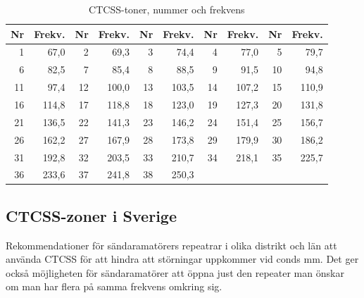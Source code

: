 \begin{table}[H]
\centering
\begin{tabular}{rr|rr|rr|rr|rr}
\textbf{Nr} & \textbf{Frekv.} & \textbf{Nr} & \textbf{Frekv.} & \textbf{Nr} & \textbf{Frekv.} & \textbf{Nr} & \textbf{Frekv.} & \textbf{Nr} & \textbf{Frekv.} \\ \hline
	 1  & 67,0            & 2           & 69,3            & 3           & 74,4            & 4           & 77,0            & 5           & 79,7            \\ \hline
	 6  & 82,5            & 7           & 85,4            & 8           & 88,5            & 9           & 91,5            & 10          & 94,8            \\ \hline
	11  & 97,4            & 12          & 100,0           & 13          & 103,5           & 14          & 107,2           & 15          & 110,9           \\ \hline
	16  & 114,8           & 17          & 118,8           & 18          & 123,0           & 19          & 127,3           & 20          & 131,8           \\ \hline
	21  & 136,5           & 22          & 141,3           & 23          & 146,2           & 24          & 151,4           & 25          & 156,7           \\ \hline
	26  & 162,2           & 27          & 167,9           & 28          & 173,8           & 29          & 179,9           & 30          & 186,2           \\ \hline
	31  & 192,8           & 32          & 203,5           & 33          & 210,7           & 34          & 218,1           & 35          & 225,7           \\ \hline
	36  & 233,6           & 37          & 241,8           & 38          & 250,3           &             &                 &             &
\end{tabular}
\caption{CTCSS-toner, nummer och frekvens}
\end{table}

\subsection{CTCSS-zoner i Sverige}

Rekommendationer för sändaramatörers repeatrar i olika distrikt och län att
använda CTCSS för att hindra att störningar uppkommer vid conds mm. Det ger
också möjligheten för sändaramatörer att öppna just den repeater man önskar om
man har flera på samma frekvens omkring sig.

